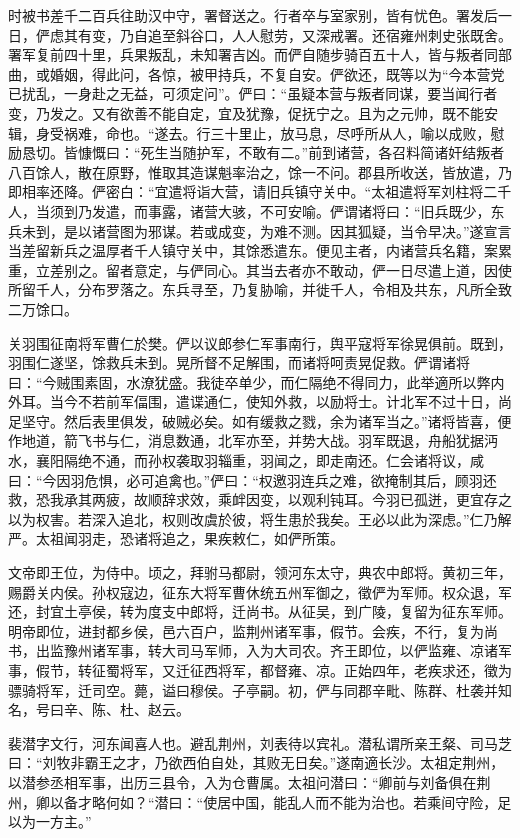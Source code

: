 \documentclass[12pt,UTF8]{ctexbook}
\begin{document}
时被书差千二百兵往助汉中守，署督送之。行者卒与室家别，皆有忧色。署发后一日，俨虑其有变，乃自追至斜谷口，人人慰劳，又深戒署。还宿雍州刺史张既舍。署军复前四十里，兵果叛乱，未知署吉凶。而俨自随步骑百五十人，皆与叛者同部曲，或婚姻，得此问，各惊，被甲持兵，不复自安。俨欲还，既等以为“今本营党已扰乱，一身赴之无益，可须定问”。俨曰：“虽疑本营与叛者同谋，要当闻行者变，乃发之。又有欲善不能自定，宜及犹豫，促抚宁之。且为之元帅，既不能安辑，身受祸难，命也。“遂去。行三十里止，放马息，尽呼所从人，喻以成败，慰励恳切。皆慷慨曰：“死生当随护军，不敢有二。”前到诸营，各召料简诸奸结叛者八百馀人，散在原野，惟取其造谋魁率治之，馀一不问。郡县所收送，皆放遣，乃即相率还降。俨密白：“宜遣将诣大营，请旧兵镇守关中。“太祖遣将军刘柱将二千人，当须到乃发遣，而事露，诸营大骇，不可安喻。俨谓诸将曰：“旧兵既少，东兵未到，是以诸营图为邪谋。若或成变，为难不测。因其狐疑，当令早决。”遂宣言当差留新兵之温厚者千人镇守关中，其馀悉遣东。便见主者，内诸营兵名籍，案累重，立差别之。留者意定，与俨同心。其当去者亦不敢动，俨一日尽遣上道，因使所留千人，分布罗落之。东兵寻至，乃复胁喻，并徙千人，令相及共东，凡所全致二万馀口。

关羽围征南将军曹仁於樊。俨以议郎参仁军事南行，舆平寇将军徐晃俱前。既到，羽围仁遂坚，馀救兵未到。晃所督不足解围，而诸将呵责晃促救。俨谓诸将曰：“今贼围素固，水潦犹盛。我徒卒单少，而仁隔绝不得同力，此举適所以弊内外耳。当今不若前军偪围，遣谍通仁，使知外救，以励将士。计北军不过十日，尚足坚守。然后表里俱发，破贼必矣。如有缓救之戮，余为诸军当之。”诸将皆喜，便作地道，箭飞书与仁，消息数通，北军亦至，并势大战。羽军既退，舟船犹据沔水，襄阳隔绝不通，而孙权袭取羽辎重，羽闻之，即走南还。仁会诸将议，咸曰：“今因羽危惧，必可追禽也。”俨曰：“权邀羽连兵之难，欲掩制其后，顾羽还救，恐我承其两疲，故顺辞求效，乘衅因变，以观利钝耳。今羽已孤迸，更宜存之以为权害。若深入追北，权则改虞於彼，将生患於我矣。王必以此为深虑。”仁乃解严。太祖闻羽走，恐诸将追之，果疾敕仁，如俨所策。

文帝即王位，为侍中。顷之，拜驸马都尉，领河东太守，典农中郎将。黄初三年，赐爵关内侯。孙权寇边，征东大将军曹休统五州军御之，徵俨为军师。权众退，军还，封宜土亭侯，转为度支中郎将，迁尚书。从征吴，到广陵，复留为征东军师。明帝即位，进封都乡侯，邑六百户，监荆州诸军事，假节。会疾，不行，复为尚书，出监豫州诸军事，转大司马军师，入为大司农。齐王即位，以俨监雍、凉诸军事，假节，转征蜀将军，又迁征西将军，都督雍、凉。正始四年，老疾求还，徵为骠骑将军，迁司空。薨，谥曰穆侯。子亭嗣。初，俨与同郡辛毗、陈群、杜袭并知名，号曰辛、陈、杜、赵云。

裴潜字文行，河东闻喜人也。避乱荆州，刘表待以宾礼。潜私谓所亲王粲、司马芝曰：“刘牧非霸王之才，乃欲西伯自处，其败无日矣。”遂南適长沙。太祖定荆州，以潜参丞相军事，出历三县令，入为仓曹属。太祖问潜曰：“卿前与刘备俱在荆州，卿以备才略何如？“潜曰：“使居中国，能乱人而不能为治也。若乘间守险，足以为一方主。”
\end{document}

